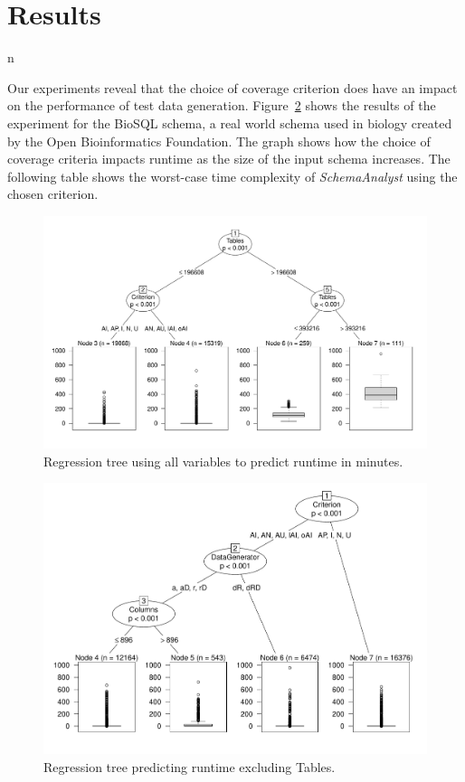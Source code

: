 \section{Results}
  n 
  \label{sec:results}

Our experiments reveal that the choice of coverage criterion does have an impact
on the performance of test data generation. 
Figure~\ref{fig:crites} shows the results of the experiment for the BioSQL
schema, a real world schema used in biology created by the
Open Bioinformatics Foundation.
The graph shows how the choice of coverage criteria impacts
runtime as the size of the input schema increases. The following table shows
the worst-case time complexity of \textit{SchemaAnalyst} using the
chosen criterion.

\begin{figure}
\centering
  \centering
  \includegraphics[width=.75\linewidth]{../diagrams/AllTree.pdf}
  \caption{Regression tree using all variables to predict runtime in
  minutes. \vspace{-.15in}}
  \label{fig:crites}
  \vspace{-.15in} 
\end{figure}

\begin{figure}
\centering
  \centering
  \includegraphics[width=.75\linewidth]{../diagrams/NoTableCtreesd.pdf}
  \caption{Regression tree predicting runtime excluding Tables.\vspace{-.15in}}
  \label{fig:crites}
  \vspace{-.15in} 
\end{figure}


